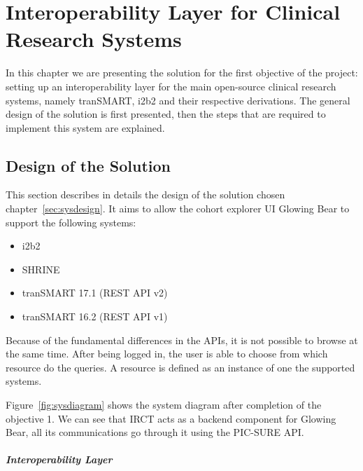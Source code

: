 
\chapter{Interoperability Layer for Clinical Research Systems}

In this chapter we are presenting the solution for the first objective of the project:
setting up an interoperability layer for the main open-source clinical research systems, namely tranSMART, i2b2 and their respective derivations.
The general design of the solution is first presented, then the steps that are required to implement this system are explained.

\section{Design of the Solution}
This section describes in details the design of the solution chosen chapter~\ref{sec:sysdesign}. 
It aims to allow the cohort explorer UI Glowing Bear to support the following systems:
\begin{itemize}
    \item i2b2
    \item SHRINE 
    \item tranSMART 17.1 (REST API v2)
    \item tranSMART 16.2 (REST API v1)
\end{itemize}

Because of the fundamental differences in the APIs, it is not possible to browse at the same time. 
After being logged in, the user is able to choose from which resource do the queries.
A resource is defined as an instance of one the supported systems.

Figure~\ref{fig:sysdiagram} shows the system diagram after completion of the objective 1.
We can see that IRCT acts as a backend component for Glowing Bear, all its communications go through it using the PIC-SURE API.

\paragraph{Interoperability Layer}

